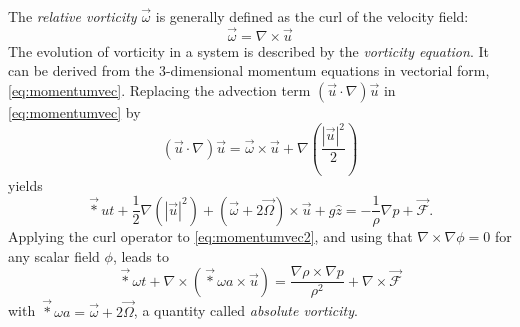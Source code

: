 The \emph{relative vorticity} \(\vec{\omega}\) is generally defined as the curl of the velocity field:
%
\begin{equation}
\vec{\omega} = \nabla \times \vec{u} \label{eq:vorticityvec}
\end{equation}
%
The evolution of vorticity in a system is described by the \emph{vorticity equation}. It can be derived from the 3-dimensional momentum equations in vectorial form, \eqref{eq:momentumvec}. Replacing the advection term \((\vec{u}\cdot\nabla)\vec{u}\) in \eqref{eq:momentumvec} by%
%
%
\begin{equation}
(\vec{u}\cdot\nabla)\vec{u} = \vec{\omega}\times\vec{u} + \nabla\left( \frac{|\vec{u}|^2}{2}\right)
\end{equation}
%
yields
%
\begin{equation}
\vec*{u}{t} + \frac{1}{2} \nabla(|\vec{u}|^2) + (\vec{\omega} + 2\vec{\Omega})\times\vec{u} + g\hat{z} = - \frac{1}{\rho} \nabla p + \vec{\mathcal{F}}. \label{eq:momentumvec2}
\end{equation}
%
Applying the curl operator to \eqref{eq:momentumvec2}, and using that \(\nabla\times\nabla\phi=0\) for any scalar field \(\phi\), leads to
%
\begin{equation} 
\vec*{\omega}{t} + \nabla\times(\vec*{\omega}{a}\times\vec{u}) = \frac{\nabla \rho \times \nabla p}{\rho^2} + \nabla\times\vec{\mathcal{F}} \label{eq:vorticity-1}
\end{equation}
%
with \(\vec*{\omega}{a} = \vec{\omega} + 2\vec{\Omega}\), a quantity called \emph{absolute vorticity}.

